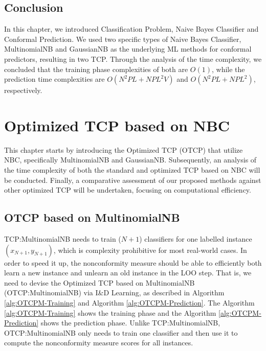\documentclass[10pt]{reportMaster}
\begin{document}
\section{Conclusion}
In this chapter, we introduced Classification Problem, Naive Bayes Classifier and Conformal Prediction. We used two specific types of Naive Bayes Classifier, MultinomialNB and GaussianNB as the underlying ML methods for conformal predictors, resulting in two TCP. Through the analysis of the time complexity, we concluded that the training phase complexities of both are $O(1)$, while the prediction time complexities are $O(N^2PL+NPL^2V)$ and $O(N^2PL+NPL^2)$, respectively.

\chapter{Optimized TCP based on NBC}

This chapter starts by introducing the Optimized TCP (OTCP) that utilize NBC, specifically MultinomialNB and GaussianNB. Subsequently, an analysis of the time complexity of both the standard and optimized TCP based on NBC will be conducted. Finally, a comparative assessment of our proposed methods against other optimized TCP will be undertaken, focusing on computational efficiency.

\section{OTCP based on MultinomialNB}

TCP:MultinomialNB needs to train ($N+1$) classifiers for one labelled instance $(x_{N+1}, y_{N+1})$, which is complexity prohibitive for most real-world cases. In order to speed it up, the nonconformity measure should be able to efficiently both learn a new instance and unlearn an old instance in the LOO step. That is, we need to devise the Optimized TCP based on MultinomialNB (OTCP:MultinomialNB) via I\&D Learning, as described in Algorithm \ref{alg:OTCPM-Training} and Algorithm \ref{alg:OTCPM-Prediction}. The Algorithm \ref{alg:OTCPM-Training} shows the training phase and the Algorithm \ref{alg:OTCPM-Prediction} shows the prediction phase. Unlike TCP:MultinomialNB, OTCP:MultinomialNB only needs to train one classifier and then use it to compute the nonconformity measure scores for all instances.\\
\end{document}
